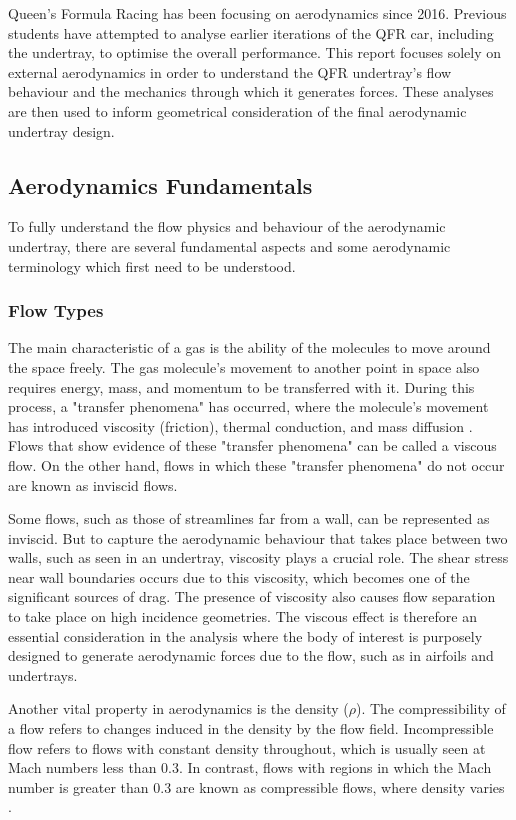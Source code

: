 \noindent Queen's Formula Racing has been focusing on aerodynamics since 2016. Previous students have attempted to analyse earlier iterations of the QFR car, including the undertray, to optimise the overall performance. This report focuses solely on external aerodynamics in order to understand the QFR undertray's flow behaviour and the mechanics through which it generates forces. These analyses are then used to inform geometrical consideration of the final aerodynamic undertray design.

\subsection{Aerodynamics Fundamentals}
To fully understand the flow physics and behaviour of the aerodynamic undertray, there are several fundamental aspects and some aerodynamic terminology which first need to be understood.

\subsubsection{Flow Types}
The main characteristic of a gas is the ability of the molecules to move around the space freely. The gas molecule's movement to another point in space also requires energy, mass, and momentum to be transferred with it. During this process, a "transfer phenomena" has occurred, where the molecule's movement has introduced viscosity (friction), thermal conduction, and mass diffusion \cite{Anderson2010FundamentalsAerodynamics}. Flows that show evidence of these "transfer phenomena" can be called a viscous flow. On the other hand, flows in which these "transfer phenomena" do not occur are known as inviscid flows.

\noindent Some flows, such as those of streamlines far from a wall, can be represented as inviscid. But to capture the aerodynamic behaviour that takes place between two walls, such as seen in an undertray, viscosity plays a crucial role. The shear stress near wall boundaries occurs due to this viscosity, which becomes one of the significant sources of drag. The presence of viscosity also causes flow separation to take place on high incidence geometries. The viscous effect is therefore an essential consideration in the analysis where the body of interest is purposely designed to generate aerodynamic forces due to the flow, such as in airfoils and undertrays.

\noindent Another vital property in aerodynamics is the density ($\rho$). The compressibility of a flow refers to changes induced in the density by the flow field. Incompressible flow refers to flows with constant density throughout, which is usually seen at Mach numbers less than 0.3. In contrast, flows with regions in which the Mach number is greater than 0.3 are known as compressible flows, where density varies \cite{Anderson2010FundamentalsAerodynamics}.

